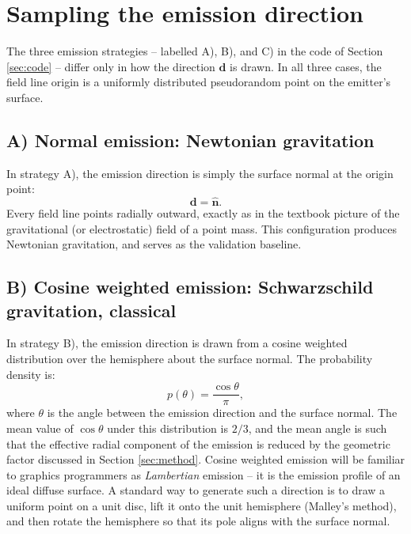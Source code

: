 \documentclass[10pt]{article}
\begin{document}
\section{Sampling the emission direction}
\label{sec:sampling}

The three emission strategies -- labelled A), B), and C) in the code of Section \ref{sec:code} -- differ only in how the direction $\mathbf{d}$ is drawn.
In all three cases, the field line origin is a uniformly distributed pseudorandom point on the emitter's surface.

\subsection{A) Normal emission: Newtonian gravitation}

In strategy A), the emission direction is simply the surface normal at the origin point:
\begin{equation}
\mathbf{d} = \hat{\mathbf{n}}.
\end{equation}
Every field line points radially outward, exactly as in the textbook picture of the gravitational (or electrostatic) field of a point mass.
This configuration produces Newtonian gravitation, and serves as the validation baseline.

\subsection{B) Cosine weighted emission: Schwarzschild gravitation, classical}

In strategy B), the emission direction is drawn from a cosine weighted distribution over the hemisphere about the surface normal.
The probability density is:
\begin{equation}
p(\theta) = \frac{\cos \theta}{\pi},
\end{equation}
where $\theta$ is the angle between the emission direction and the surface normal.
The mean value of $\cos \theta$ under this distribution is $2/3$, and the mean angle is such that the effective radial component of the emission is reduced by the geometric factor discussed in Section \ref{sec:method}.
Cosine weighted emission will be familiar to graphics programmers as {\em Lambertian} emission -- it is the emission profile of an ideal diffuse surface.
A standard way to generate such a direction is to draw a uniform point on a unit disc, lift it onto the unit hemisphere (Malley's method), and then rotate the hemisphere so that its pole aligns with the surface normal.
\end{document}

